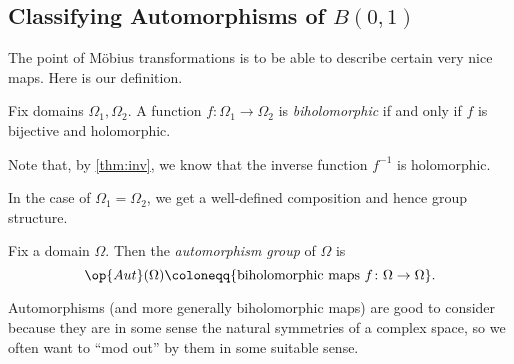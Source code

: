 \subsection{Classifying Automorphisms of \texorpdfstring{$B(0,1)$}{B(0,1)}}
The point of M\"obius transformations is to be able to describe certain very nice maps. Here is our definition.
\begin{definition}[Biholomorphic]
	Fix domains $\Omega_1,\Omega_2$. A function $f\colon\Omega_1\to\Omega_2$ is \textit{biholomorphic} if and only if $f$ is bijective and holomorphic.
\end{definition}
Note that, by \autoref{thm:inv}, we know that the inverse function $f^{-1}$ is holomorphic.

In the case of $\Omega_1=\Omega_2$, we get a well-defined composition and hence group structure.
\begin{definition}[Automorphism]
	Fix a domain $\Omega$. Then the \textit{automorphism group} of $\Omega$ is
	\[\op{Aut}(\Omega)\coloneqq\{\text{biholomorphic maps }f\colon\Omega\to\Omega\}.\]
\end{definition}
Automorphisms (and more generally biholomorphic maps) are good to consider because they are in some sense the natural symmetries of a complex space, so we often want to ``mod out'' by them in some suitable sense.

